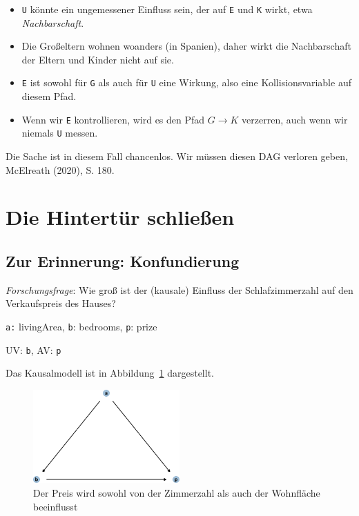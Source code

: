 \documentclass[
  a4paper,
  DIV=11]{scrreprt}
\theoremstyle{definition}
\theoremstyle{remark}
\begin{document}
\begin{itemize}
\item
  \texttt{U} könnte ein ungemessener Einfluss sein, der auf \texttt{E}
  und \texttt{K} wirkt, etwa \emph{Nachbarschaft}.
\item
  Die Großeltern wohnen woanders (in Spanien), daher wirkt die
  Nachbarschaft der Eltern und Kinder nicht auf sie.
\item
  \texttt{E} ist sowohl für \texttt{G} als auch für \texttt{U} eine
  Wirkung, also eine Kollisionsvariable auf diesem Pfad.
\item
  Wenn wir \texttt{E} kontrollieren, wird es den Pfad
  \(G \rightarrow K\) verzerren, auch wenn wir niemals \texttt{U}
  messen.
\end{itemize}

Die Sache ist in diesem Fall chancenlos. Wir müssen diesen DAG verloren
geben, McElreath (2020), S. 180.

\hypertarget{die-hintertuxfcr-schlieuxdfen}{%
\section{Die Hintertür schließen}\label{die-hintertuxfcr-schlieuxdfen}}

\hypertarget{zur-erinnerung-konfundierung}{%
\subsection{Zur Erinnerung:
Konfundierung}\label{zur-erinnerung-konfundierung}}

\emph{Forschungsfrage}: Wie groß ist der (kausale) Einfluss der
Schlafzimmerzahl auf den Verkaufspreis des Hauses?

\texttt{a:} livingArea, \texttt{b}: bedrooms, \texttt{p}: prize

UV: \texttt{b}, AV: \texttt{p}

Das Kausalmodell ist in Abbildung~\ref{fig-dag-don1} dargestellt.

\begin{figure}

{\centering \includegraphics[width=0.5\textwidth,height=\textheight]{./kausal_files/figure-pdf/fig-dag-don1-1.pdf}

}

\caption{\label{fig-dag-don1}Der Preis wird sowohl von der Zimmerzahl
als auch der Wohnfläche beeinflusst}

\end{figure}
\end{document}
